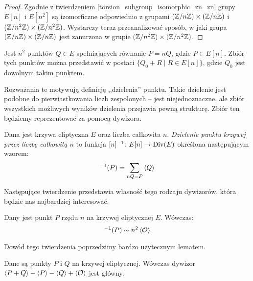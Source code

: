 \begin{proof}
Zgodnie z twierdzeniem \ref{torsion_subgroup_isomorphic_zn_zn}
grupy $E[n]$ i $E[n^2]$ są izomorficzne
odpowiednio z grupami
$(\mathbb{Z}/n\mathbb{Z})\times(\mathbb{Z}/n\mathbb{Z})$ i $(\mathbb{Z}/n^2\mathbb{Z})\times(\mathbb{Z}/n^2\mathbb{Z})$.
Wystarczy teraz przeanalizować sposób,
w jaki grupa $(\mathbb{Z}/n\mathbb{Z})\times(\mathbb{Z}/n\mathbb{Z})$
jest zanurzona w grupie $(\mathbb{Z}/n^2\mathbb{Z})\times(\mathbb{Z}/n^2\mathbb{Z})$.
\end{proof}

\begin{corollary}\label{point_division_corollary}
Jest $n^2$ punktów $Q \in E$ spełniających równanie $P = nQ$,
gdzie $P \in E[n]$.
Zbiór tych punktów można przedstawić w postaci $\{Q_0 + R \mid R \in E[n]\}$,
gdzie $Q_0$ jest dowolnym takim punktem.
\end{corollary}

\noindent
Rozważania te motywują definicję ,,dzielenia'' punktu.
Takie dzielenie jest podobne do pierwiastkowania liczb zespolonych --
jest niejednoznaczne, ale zbiór wszystkich możliwych wyników dzielenia
przejawia pewną strukturę.
Zbiór ten będziemy reprezentować za pomocą dywizora.

\begin{definition}
Dana jest krzywa eliptyczna $E$
oraz liczba całkowita $n$.
\emph{Dzielenie punktu krzywej przez liczbę całkowitą $n$}
to funkcja $[n]^{-1} \colon E[n] \to \operatorname{Div}(E)$
określona następującym wzorem:
\begin{equation}
[n]^{-1}(P) = \sum_{nQ = P} \divi{Q}
\end{equation}
\end{definition}

\noindent
Następujące twierdzenie przedstawia własność tego rodzaju dywizorów,
która będzie nas najbardziej interesować.

\begin{theorem}\label{point_division_divisor_principle_theorem}
Dany jest punkt $P$ rzędu $n$ na krzywej eliptycznej $E$.
Wówczas:
\begin{eqnarray*}
[n]^{-1}(P) \sim n^2\divi{\ecident}
\end{eqnarray*}
\end{theorem}

\noindent
Dowód tego twierdzenia poprzedzimy bardzo użytecznym lematem.

\begin{lemma}\label{divi_reduction_lemma}
Dane są punkty $P$ i $Q$ na krzywej eliptycznej.
Wówczas dywizor $\left\langle P+Q\right\rangle - \left\langle P\right\rangle - \left\langle Q\right\rangle + \left\langle\mathcal{O}\right\rangle$
jest główny.
\end{lemma}

